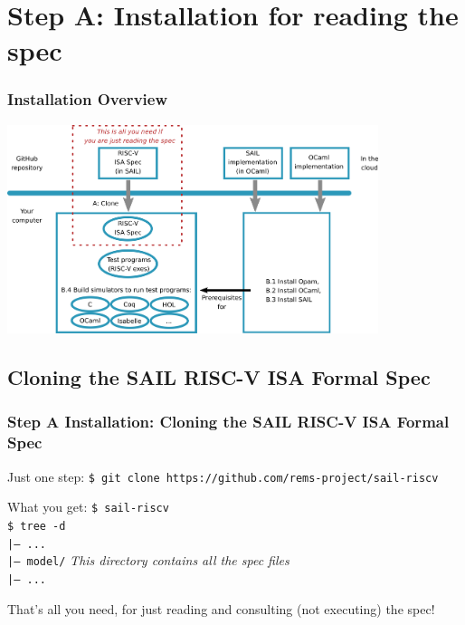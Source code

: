 \documentclass[aspectratio=169]{beamer}
\newcommand{\hm}{\hspace*{1em}}
\newcommand{\scripttt}{\scriptsize\tt}
\begin{document}

\section{Step A: Installation for reading the spec}

\begin{frame}
  \frametitle{Installation Overview}

  \centering
  \includegraphics[height=2.4in]{Figures/Fig_Installation_Overview.png}
\end{frame}



\subsection{Cloning the SAIL RISC-V ISA Formal Spec}

\begin{frame}
  \frametitle{Step A Installation: Cloning the SAIL RISC-V ISA Formal Spec}

  \begin{block}{Just one step:}
    {\scripttt\hm{}\$ git clone https://github.com/rems-project/sail-riscv}
  \end{block}

  \begin{block}{What you get:}
    {\scripttt\hm{}\$ sail-riscv} \\
    {\scripttt\hm{}\$ tree -d} \\
    {\scripttt\hm{}|-- ...} \\
    {\scripttt\hm{}|-- model/} \hspace{5em} \emph{This directory contains all the spec files}\\
    {\scripttt\hm{}|-- ...} \\
  \end{block}

  That's all you need, for just reading and consulting (not executing) the spec!

\end{frame}
\end{document}
